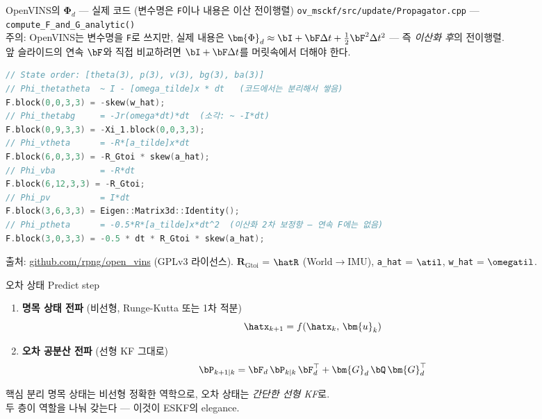 \begin{frame}[fragile]{OpenVINS의 $\bm{\Phi}_d$ — 실제 코드 (변수명은 \texttt{F}이나 내용은 이산 전이행렬)}
  \texttt{ov\_msckf/src/update/Propagator.cpp} — \texttt{compute\_F\_and\_G\_analytic()}\\
  \footnotesize \alert{주의}: OpenVINS는 변수명을 \texttt{F}로 쓰지만, 실제 내용은
  $\bm{\Phi}_d \approx \bI + \bF\Delta t + \tfrac{1}{2}\bF^2\Delta t^2$ — 즉 \emph{이산화 후}의 전이행렬.\\
  앞 슬라이드의 연속 $\bF$와 직접 비교하려면 $\bI + \bF\Delta t$를 머릿속에서 더해야 한다.
\begin{lstlisting}[language=C++, basicstyle=\ttfamily\tiny]
// State order: [theta(3), p(3), v(3), bg(3), ba(3)]
// Phi_thetatheta  ~ I - [omega_tilde]x * dt   (코드에서는 분리해서 쌓음)
F.block(0,0,3,3) = -skew(w_hat);
// Phi_thetabg     = -Jr(omega*dt)*dt  (소각: ~ -I*dt)
F.block(0,9,3,3) = -Xi_1.block(0,0,3,3);
// Phi_vtheta      = -R*[a_tilde]x*dt
F.block(6,0,3,3) = -R_Gtoi * skew(a_hat);
// Phi_vba         = -R*dt
F.block(6,12,3,3) = -R_Gtoi;
// Phi_pv          = I*dt
F.block(3,6,3,3) = Eigen::Matrix3d::Identity();
// Phi_ptheta      = -0.5*R*[a_tilde]x*dt^2  (이산화 2차 보정항 — 연속 F에는 없음)
F.block(3,0,3,3) = -0.5 * dt * R_Gtoi * skew(a_hat);
\end{lstlisting}
  \vspace{0.2em}
  {\footnotesize 출처: \url{github.com/rpng/open_vins} (GPLv3 라이선스).
  $\bm{R}_{\text{Gtoi}}$ = $\hatR$ (World$\to$IMU), \texttt{a\_hat} = $\atil$, \texttt{w\_hat} = $\omegatil$.}
\end{frame}

\begin{frame}{오차 상태 Predict step}
  \begin{enumerate}
    \item \textbf{명목 상태 전파} (비선형, Runge-Kutta 또는 1차 적분)
      \[
        \hatx_{k+1} = f(\hatx_k,\, \bm{u}_k)
      \]
    \item \textbf{오차 공분산 전파} (선형 KF 그대로)
      \[
        \bP_{k+1|k} = \bF_d\,\bP_{k|k}\,\bF_d^\top + \bm{G}_d\,\bQ\,\bm{G}_d^\top
      \]
  \end{enumerate}
  \pause
  \vspace{0.3em}
  \begin{block}{핵심 분리}
    명목 상태는 비선형 정확한 역학으로, 오차 상태는 \emph{간단한 선형 KF}로. \\
    두 층이 역할을 나눠 갖는다 — 이것이 ESKF의 elegance.
  \end{block}
\end{frame}

